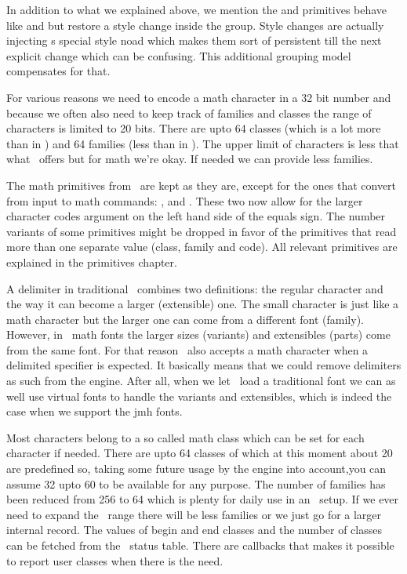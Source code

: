 In addition to what we explained above, we mention the \typ {\beginmathgroup} and
\typ {\endmathgroup} primitives behave like \typ {\begingroup} and \typ {\endgroup}
but restore a style change inside the group. Style changes are actually injecting
s special style noad which makes them sort of persistent till the next explicit
change which can be confusing. This additional grouping model compensates for
that.

\stopsection

\startsection[title={Unicode math characters}]

For various reasons we need to encode a math character in a 32 bit number and
because we often also need to keep track of families and classes the range of
characters is limited to 20 bits. There are upto 64 classes (which is a lot more
than in \LUATEX) and 64 families (less than in \LUATEX). The upper limit of
characters is less that what \UNICODE\ offers but for math we're okay. If needed
we can provide less families.

The math primitives from \TEX\ are kept as they are, except for the ones that
convert from input to math commands: , and . These
two now allow for the larger character codes argument on the left hand side of
the equals sign. The number variants of some primitives might be dropped in favor
of the primitives that read more than one separate value (class, family and
code). All relevant primitives are explained in the primitives chapter.

A delimiter in traditional \TEX\ combines two definitions: the regular character
and the way it can become a larger (extensible) one. The small character is just
like a math character but the larger one can come from a different font (family).
However, in \OPENTYPE\ math fonts the larger sizes (variants) and extensibles
(parts) come from the same font. For that reason \LUAMETATEX\ also accepts a math
character when a delimited specifier is expected. It basically means that we
could remove delimiters as such from the engine. After all, when we let \LUA\
load a traditional font we can as well use virtual fonts to handle the variants
and extensibles, which is indeed the case when we support the jmh fonts.

\stopsection

\startsection[title={Math classes}]

Most characters belong to a so called math class which can be set for each
character if needed. There are upto 64 classes of which at this moment about 20
are predefined so, taking some future usage by the engine into account,you can
assume 32 upto 60 to be available for any purpose. The number of families has
been reduced from 256 to 64 which is plenty for daily use in an \OPENTYPE\ setup.
If we ever need to expand the \UNICODE\ range there will be less families or we
just go for a larger internal record. The values of begin and end classes and the
number of classes can be fetched from the \LUA\ status table. There are callbacks
that makes it possible to report user classes when there is the need.

